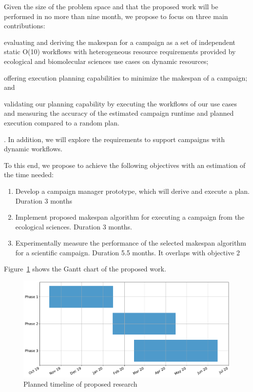 \label{timeline}
Given the size of the problem space and that the proposed work will be performed in no more than nine month, we propose to focus on three main contributions:
\begin{inparaenum}[(1)]
\item evaluating and deriving the makespan for a campaign as a set of independent static O(10) workflows with heterogeneous resource requirements provided by ecological and biomolecular sciences use cases on dynamic resources; 
\item offering execution planning capabilities to minimize the makespan of a campaign; and 
\item validating our planning capability by executing the workflows of our use cases and measuring the accuracy of the estimated campaign runtime and planned execution compared to a random plan.
\end{inparaenum}.
In addition, we will explore the requirements to support campaigns with dynamic workflows.

To this end, we propose to achieve the following objectives with an estimation of the time needed:
\begin{enumerate}
    \item Develop a campaign manager prototype, which will derive and execute a plan. Duration 3 months
    \item Implement proposed makespan algorithm for executing a campaign from the ecological sciences. Duration 3 months.
    \item Experimentally measure the performance of the selected makespan algorithm for a scientific campaign. Duration 5.5 months. It overlaps with objective 2 
\end{enumerate}
Figure~\ref{fig:work_plan} shows the Gantt chart of the proposed work.

\begin{figure}[t]
	\centering
	\includegraphics[width=.95\textwidth]{figures/phd_plan.pdf}
	\caption{Planned timeline of proposed research}\label{fig:work_plan}
\end{figure}

